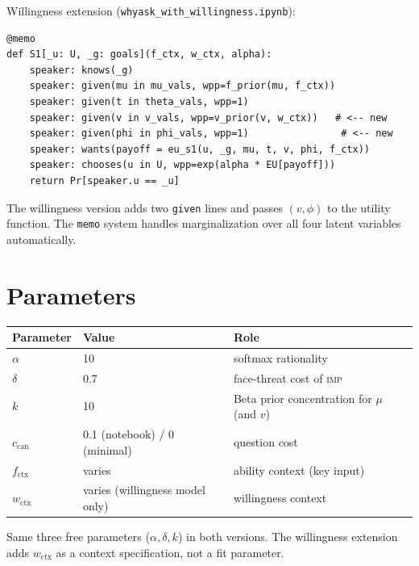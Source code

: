 \documentclass[11pt]{article}
\begin{document}
Willingness extension (\texttt{whyask\_with\_willingness.ipynb}):
\begin{verbatim}
@memo
def S1[_u: U, _g: goals](f_ctx, w_ctx, alpha):
    speaker: knows(_g)
    speaker: given(mu in mu_vals, wpp=f_prior(mu, f_ctx))
    speaker: given(t in theta_vals, wpp=1)
    speaker: given(v in v_vals, wpp=v_prior(v, w_ctx))   # <-- new
    speaker: given(phi in phi_vals, wpp=1)                # <-- new
    speaker: wants(payoff = eu_s1(u, _g, mu, t, v, phi, f_ctx))
    speaker: chooses(u in U, wpp=exp(alpha * EU[payoff]))
    return Pr[speaker.u == _u]
\end{verbatim}

The willingness version adds two \texttt{given} lines and passes $(v, \phi)$ to
the utility function. The \texttt{memo} system handles marginalization over all
four latent variables automatically.

\section{Parameters}

\begin{center}
\renewcommand{\arraystretch}{1.4}
\begin{tabular}{lll}
\toprule
\textbf{Parameter} & \textbf{Value} & \textbf{Role} \\
\midrule
$\alpha$           & 10   & softmax rationality \\
$\delta$           & 0.7  & face-threat cost of \textsc{imp} \\
$k$                & 10   & Beta prior concentration for $\mu$ (and $v$) \\
$c_{\text{can}}$   & 0.1 (notebook) / 0 (minimal) & question cost \\
$f_{\text{ctx}}$   & varies & ability context (key input) \\
$w_{\text{ctx}}$   & varies (willingness model only) & willingness context \\
\bottomrule
\end{tabular}
\end{center}

Same three free parameters ($\alpha, \delta, k$) in both versions.
The willingness extension adds $w_{\text{ctx}}$ as a context specification, not
a fit parameter.

\end{document}
